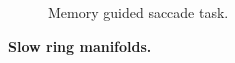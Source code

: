 \documentclass{article}
\newcounter{ct}
\theoremstyle{definition}
\theoremstyle{remark}
\begin{document}
\begin{figure}[htbp]
\begin{subfigure}[b]{0.45\textwidth}
        \caption{Memory guided saccade task.}
    \label{fig:slowcenterout}
    \end{subfigure}
    \caption{\textbf{Slow ring manifolds.}}
    \label{fig:slowmanifolds}
\end{figure}



%
%
%
%
%
%
%
%
\end{document}
